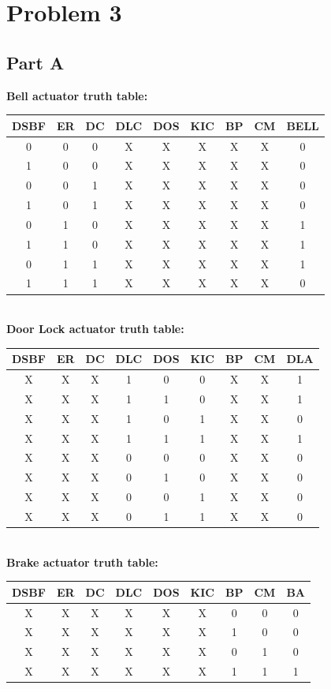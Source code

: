 \documentclass{article}
\begin{document}
\section{Problem 3}

\subsection{Part A}
\textbf{Bell actuator truth table:}
\\
\begin{tabular} {c c c c c c c c | c}
    \hline
    DSBF & ER & DC & DLC & DOS & KIC & BP & CM & BELL \\
    \hline
    0 & 0 & 0 & X & X & X & X & X & 0 \\
    1 & 0 & 0 & X & X & X & X & X & 0 \\
    0 & 0 & 1 & X & X & X & X & X & 0 \\
    1 & 0 & 1 & X & X & X & X & X & 0 \\
    0 & 1 & 0 & X & X & X & X & X & 1 \\
    1 & 1 & 0 & X & X & X & X & X & 1 \\
    0 & 1 & 1 & X & X & X & X & X & 1 \\
    1 & 1 & 1 & X & X & X & X & X & 0 \\
\end{tabular}
\\

\noindent\textbf{Door Lock actuator truth table:}
\\
\begin{tabular} {c c c c c c c c | c}
    \hline
    DSBF & ER & DC & DLC & DOS & KIC & BP & CM & DLA \\
    \hline
    X & X & X & 1 & 0 & 0 & X & X & 1 \\
    X & X & X & 1 & 1 & 0 & X & X & 1 \\
    X & X & X & 1 & 0 & 1 & X & X & 0 \\
    X & X & X & 1 & 1 & 1 & X & X & 1 \\
    X & X & X & 0 & 0 & 0 & X & X & 0 \\
    X & X & X & 0 & 1 & 0 & X & X & 0 \\
    X & X & X & 0 & 0 & 1 & X & X & 0 \\
    X & X & X & 0 & 1 & 1 & X & X & 0 \\
\end{tabular}
\\

\noindent\textbf{Brake actuator truth table:}
\\
\begin{tabular} {c c c c c c c c | c}
    \hline
    DSBF & ER & DC & DLC & DOS & KIC & BP & CM & BA \\
    \hline
    X & X & X & X & X & X & 0 & 0 & 0 \\
    X & X & X & X & X & X & 1 & 0 & 0 \\
    X & X & X & X & X & X & 0 & 1 & 0 \\
    X & X & X & X & X & X & 1 & 1 & 1 \\
\end{tabular}
\\
\end{document}
